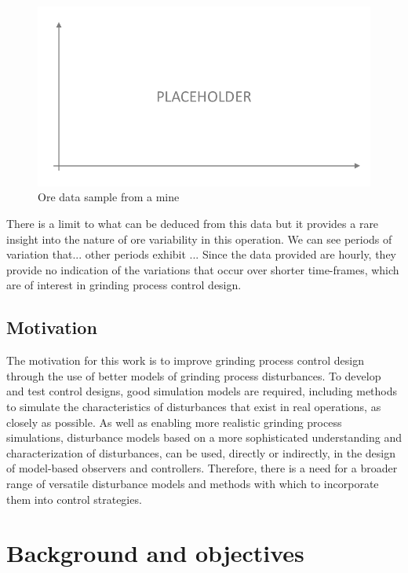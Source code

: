 \begin{figure}[htp]
	\centering
	\includegraphics[width=12cm]{images/placeholder.pdf}
	\caption{Ore data sample from a mine}
	\label{fig:dist_sample}
\end{figure}

There is a limit to what can be deduced from this data but it provides a rare insight into the nature of ore variability in this operation. We can see periods of variation that...  other periods exhibit ... Since the data provided are hourly, they provide no indication of the variations that occur over shorter time-frames, which are of interest in grinding process control design.

\subsection*{Motivation}

The motivation for this work is to improve grinding process control design through the use of better models of grinding process disturbances. To develop and test control designs, good simulation models are required, including methods to simulate the characteristics of disturbances that exist in real operations, as closely as possible. As well as enabling more realistic grinding process simulations, disturbance models based on a more sophisticated understanding and characterization of disturbances, can be used, directly or indirectly, in the design of model-based observers and controllers. Therefore, there is a need for a broader range of versatile disturbance models and methods with which to incorporate them into control strategies.


\section*{Background and objectives}

